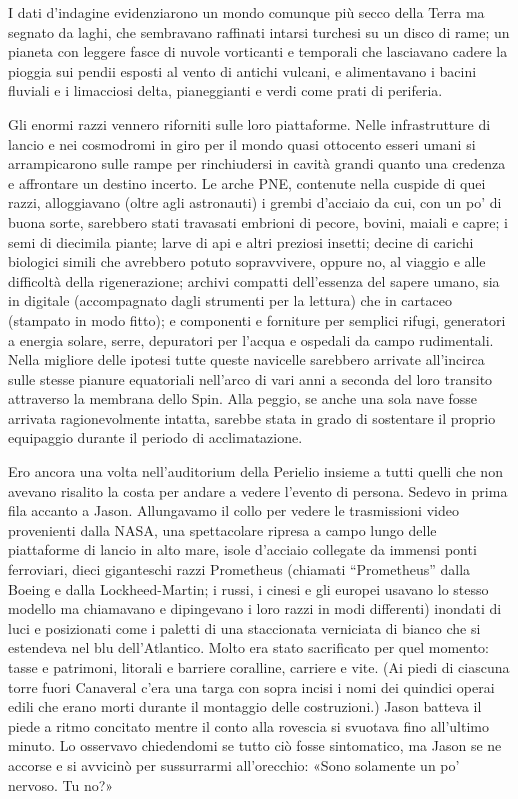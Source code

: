 \separatorefiori

I dati d'indagine evidenziarono un mondo comunque più secco della Terra
ma segnato da laghi, che sembravano raffinati intarsi turchesi su un
disco di rame; un pianeta con leggere fasce di nuvole vorticanti e
temporali che lasciavano cadere la pioggia sui pendii esposti al vento
di antichi vulcani, e alimentavano i bacini fluviali e i limacciosi
delta, pianeggianti e verdi come prati di periferia.

Gli enormi razzi vennero riforniti sulle loro piattaforme. Nelle
infrastrutture di lancio e nei cosmodromi in giro per il mondo quasi
ottocento esseri umani si arrampicarono sulle rampe per rinchiudersi in
cavità grandi quanto una credenza e affrontare un destino incerto. Le
arche PNE, contenute nella cuspide di quei razzi, alloggiavano (oltre
agli astronauti) i grembi d'acciaio da cui, con un po' di buona sorte,
sarebbero stati travasati embrioni di pecore, bovini, maiali e capre; i
semi di diecimila piante; larve di api e altri preziosi insetti; decine
di carichi biologici simili che avrebbero potuto sopravvivere, oppure
no, al viaggio e alle difficoltà della rigenerazione; archivi compatti
dell'essenza del sapere umano, sia in digitale (accompagnato dagli
strumenti per la lettura) che in cartaceo (stampato in modo fitto); e
componenti e forniture per semplici rifugi, generatori a energia solare,
serre, depuratori per l'acqua e ospedali da campo rudimentali. Nella
migliore delle ipotesi tutte queste navicelle sarebbero arrivate
all'incirca sulle stesse pianure equatoriali nell'arco di vari anni a
seconda del loro transito attraverso la membrana dello Spin. Alla
peggio, se anche una sola nave fosse arrivata ragionevolmente intatta,
sarebbe stata in grado di sostentare il proprio equipaggio durante il
periodo di acclimatazione.

Ero ancora una volta nell'auditorium della Perielio insieme a tutti
quelli che non avevano risalito la costa per andare a vedere l'evento di
persona. Sedevo in prima fila accanto a Jason. Allungavamo il collo per
vedere le trasmissioni video provenienti dalla NASA, una spettacolare
ripresa a campo lungo delle piattaforme di lancio in alto mare, isole
d'acciaio collegate da immensi ponti ferroviari, dieci giganteschi razzi
Prometheus (chiamati ``Prometheus'' dalla Boeing e dalla
Lockheed-Martin; i russi, i cinesi e gli europei usavano lo stesso
modello ma chiamavano e dipingevano i loro razzi in modi differenti)
inondati di luci e posizionati come i paletti di una staccionata
verniciata di bianco che si estendeva nel blu dell'Atlantico. Molto era
stato sacrificato per quel momento: tasse e patrimoni, litorali e
barriere coralline, carriere e vite. (Ai piedi di ciascuna torre fuori
Canaveral c'era una targa con sopra incisi i nomi dei quindici operai
edili che erano morti durante il montaggio delle costruzioni.) Jason
batteva il piede a ritmo concitato mentre il conto alla rovescia si
svuotava fino all'ultimo minuto. Lo osservavo chiedendomi se tutto ciò
fosse sintomatico, ma Jason se ne accorse e si avvicinò per sussurrarmi
all'orecchio: «Sono solamente un po' nervoso. Tu no?»

